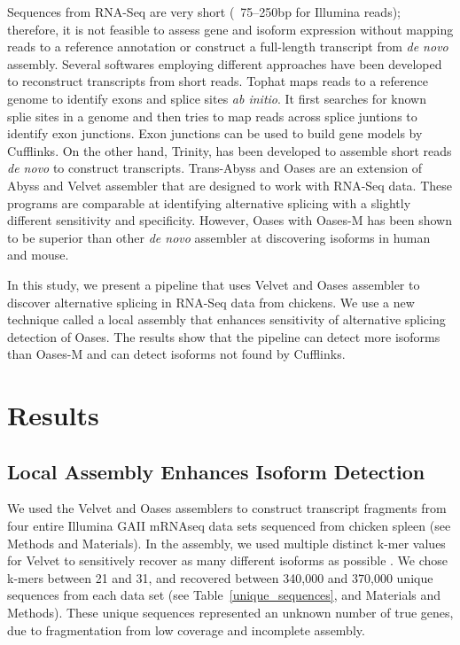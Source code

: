 \documentclass[10pt]{article}
\begin{document}
Sequences from RNA-Seq are very short (~75--250bp for Illumina reads); therefore, it is not feasible to assess gene
and isoform expression without mapping reads to a reference annotation or construct a full-length transcript from
\emph{de novo} assembly.
Several softwares employing different approaches have been developed to reconstruct transcripts from short reads.
Tophat\cite{Trapnell:2009dp} maps reads to a reference genome to identify exons and splice sites \emph{ab initio}.
It first searches for known splie sites in a genome and then tries to map reads across splice juntions to identify exon junctions.
Exon junctions can be used to build gene models by Cufflinks\cite{Trapnell:2010kd}.
On the other hand, Trinity\cite{Grabherr:2011jb}, has been developed to assemble short reads \emph{de novo} to construct transcripts.
Trans-Abyss\cite{Robertson:2010ih} and Oases\cite{Schulz:2012je} are an extension of Abyss\cite{Simpson:2009iv} and Velvet\cite{Zerbino:2008vu,Zerbino:2009jp} assembler that are designed to work with RNA-Seq data.
These programs are comparable at identifying alternative splicing with a slightly different sensitivity and specificity.
However, Oases with Oases-M has been shown to be superior than other \emph{de novo} assembler at discovering isoforms in human and mouse\cite{Schulz:2012je}.

In this study, we present a pipeline that uses Velvet and Oases assembler to discover alternative splicing in RNA-Seq data from chickens.
We use a new technique called a local assembly that enhances sensitivity of alternative splicing detection of Oases.
The results show that the pipeline can detect more isoforms than Oases-M and can detect isoforms not found by
Cufflinks.

\section*{Results}

\subsection*{Local Assembly Enhances Isoform Detection}

We used the Velvet\cite{Zerbino:2008vu} and Oases\cite{Schulz:2012je}
assemblers to construct transcript fragments from four entire Illumina
GAII mRNAseq data sets sequenced from chicken spleen (see Methods and
Materials).  In the assembly, we used multiple distinct k-mer values
for Velvet to sensitively recover as many different isoforms as possible
\cite{Schulz:2012je}.  We chose k-mers between 21 and 31,
and recovered between 340,000 and 370,000 unique sequences from
each data set (see Table~\ref{unique_sequences}, and Materials and
Methods).  These unique sequences represented an unknown number of
true genes, due to fragmentation from low coverage and incomplete
assembly.
\end{document}
